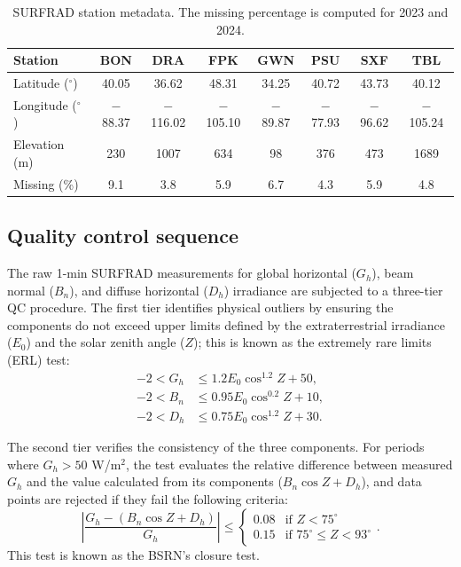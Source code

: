 \documentclass[number, 3p, 10pt, times]{elsarticle}
\begin{document}
\begin{table}[ht]
\centering
\caption{SURFRAD station metadata. The missing percentage is computed for 2023 and 2024.}
\label{tb:meta}
\footnotesize
\begin{tabular}{lccccccc}
\toprule
Station & BON & DRA & FPK & GWN & PSU & SXF & TBL \\
\midrule
Latitude ($^\circ$) & 40.05 & 36.62 & 48.31 & 34.25 & 40.72 & 43.73 & 40.12 \\
Longitude ($^\circ$) & $-$88.37 & $-$116.02 & $-$105.10 & $-$89.87 & $-$77.93 & $-$96.62 & $-$105.24 \\
Elevation (m) & 230 & 1007 & 634 & 98 & 376 & 473 & 1689 \\
Missing (\%) & 9.1 & 3.8 & 5.9 & 6.7 & 4.3 & 5.9 & 4.8 \\
\bottomrule
\end{tabular}
\end{table}

\subsection{Quality control sequence}
The raw 1-min SURFRAD measurements for global horizontal ($G_h$), beam normal ($B_n$), and diffuse horizontal ($D_h$) irradiance are subjected to a three-tier QC procedure. The first tier identifies physical outliers by ensuring the components do not exceed upper limits defined by the extraterrestrial irradiance ($E_0$) and the solar zenith angle ($Z$); this is known as the extremely rare limits (ERL) test:
\begin{align}
    -2 < G_h & \leq 1.2 E_0 \cos^{1.2}Z + 50, \\
    -2 < B_n & \leq 0.95 E_0 \cos^{0.2}Z + 10, \\
    -2 < D_h & \leq 0.75 E_0 \cos^{1.2}Z + 30.
\end{align}

The second tier verifies the consistency of the three components. For periods where $G_h > 50$ W/m$^2$, the test evaluates the relative difference between measured $G_h$ and the value calculated from its components ($B_n \cos Z + D_h$), and data points are rejected if they fail the following criteria:
\begin{equation}
    \left| \frac{G_h - (B_n \cos Z + D_h)}{G_h} \right| \leq 
    \begin{cases} 
    0.08 & \text{if } Z < 75^\circ \\
    0.15 & \text{if } 75^\circ \leq Z < 93^\circ
    \end{cases}.
\end{equation}
This test is known as the BSRN's closure test.
\end{document}

